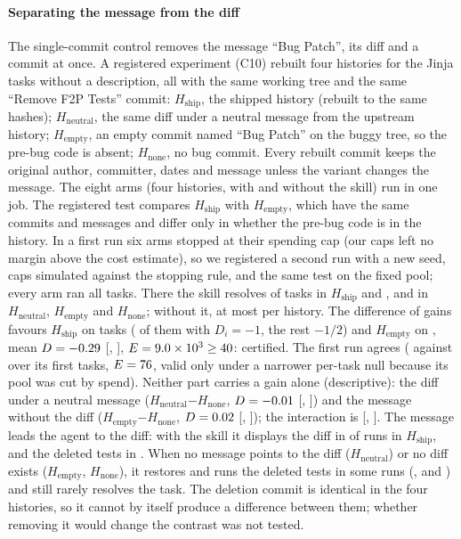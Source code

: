 \documentclass[sigconf,review,anonymous]{acmart}
\newcommand{\Hship}{\ensuremath{H_{\mathrm{ship}}}}
\newcommand{\Hneu}{\ensuremath{H_{\mathrm{neutral}}}}
\newcommand{\Hemp}{\ensuremath{H_{\mathrm{empty}}}}
\newcommand{\Hnone}{\ensuremath{H_{\mathrm{none}}}}
\begin{document}
\paragraph{Separating the message from the diff}
The single-commit control removes the message ``Bug Patch'', its diff and a commit at once. A
registered experiment (C10) rebuilt four histories for the \nctenTasks{} Jinja tasks without a
description, all with the same working tree and the same ``Remove F2P Tests'' commit: \Hship{}, the shipped
history (rebuilt to the same hashes); \Hneu{}, the same diff under a neutral message from the upstream
history; \Hemp{}, an empty commit named ``Bug Patch'' on the buggy tree, so the pre-bug code is absent; \Hnone{},
no bug commit. Every rebuilt commit keeps the original author, committer, dates and message unless
the variant changes the message. The eight arms (four histories, with and without the skill) run in
one job. The
registered test compares \Hship{} with \Hemp{}, which have the same commits and messages and differ only in
whether the pre-bug code is in the history. In a first run six arms stopped at their spending cap
(our caps left no margin above the cost estimate), so we registered a second run with a new seed,
caps simulated against the stopping rule, and the same test on the fixed pool; every arm ran all
\nctrACN{} tasks. There the skill resolves \nctrASkill{} of \nctrASkillN{} tasks in \Hship{} and
\nctrBSkill{}, \nctrCSkill{} and \nctrDSkill{} in \Hneu{}, \Hemp{} and \Hnone{}; without it, at most \nctrNoneMax{} per
history. The difference of gains favours \Hship{} on \nctrACNeg{} tasks (\nctrACFull{} of them with
$D_i=-1$, the rest $-1/2$) and \Hemp{} on \nctrACPos{}, mean
$D=-0.29{}$ [\nctrACLo{}, \nctrACHi{}], $E=9.0\times10^{3}{}\geq 40$: certified. The first run agrees
(\nctenACNeg{} against \nctenACPos{} over its first \nctenACN{} tasks, $E=76{}$, valid only
under a narrower per-task null because its pool was cut by spend). Neither part carries a gain alone
(descriptive): the diff under a neutral message (\Hneu{}$-$\Hnone{}, $D=-0.01{}$ [\nctrBDLo{},
\nctrBDHi{}]) and the message without the diff (\Hemp{}$-$\Hnone{}, $D=0.02{}$ [\nctrCDLo{},
\nctrCDHi{}]); the interaction is \nctrIxMean{} [\nctrIxLo{}, \nctrIxHi{}]. The message leads the
agent to the diff: with the skill it displays the diff in \nctrADiff{} of \nctrASkillN{} runs in \Hship{},
and the deleted tests in \nctrATests{}.
When no message points to the diff (\Hneu{}) or no diff exists (\Hemp{}, \Hnone{}), it restores and runs the deleted
tests in some runs (\nctrBTests{}, \nctrCTests{} and \nctrDTests{}) and still rarely resolves the
task. The deletion commit is identical in the four histories, so it cannot by itself produce a
difference between them; whether removing it would change the contrast was not tested.
\end{document}
